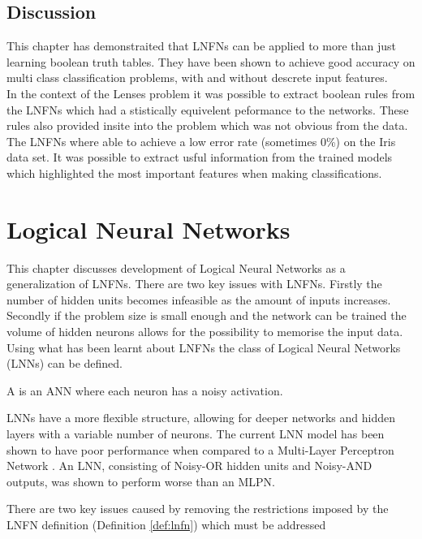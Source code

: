 \section{Discussion}
This chapter has demonstraited that LNFNs can be applied to more than just learning boolean truth tables. They have been shown to achieve good accuracy on multi class classification problems, with and without descrete input features.\\

In the context of the Lenses problem it was possible to extract boolean rules from the LNFNs which had a stistically equivelent peformance to the networks. These rules also provided insite into the problem which was not obvious from the data.\\

The LNFNs where able to achieve a low error rate (sometimes 0\%) on the Iris data set. It was possible to extract usful information from the trained models which highlighted the most important features when making classifications.

\chapter{Logical Neural Networks} \label{C:lnn}
This chapter discusses development of Logical Neural Networks as a generalization of LNFNs. There are two key issues with LNFNs. Firstly the number of hidden units becomes infeasible as the amount of inputs increases. Secondly if the problem size is small enough and the network can be trained the volume of hidden neurons allows for the possibility to memorise the input data.\\

Using what has been learnt about LNFNs the class of Logical Neural Networks (LNNs) can be defined.

\begin{definition}
	A  is an ANN where each neuron has a noisy activation.
\end{definition}

LNNs have a more flexible structure, allowing for deeper networks and hidden layers with a variable number of neurons. The current LNN model has been shown to have poor performance when compared to a Multi-Layer Perceptron Network \cite{LearningLogicalActivations}. An LNN, consisting of Noisy-OR hidden units and Noisy-AND outputs, was shown to perform worse than an MLPN. 

There are two key issues caused by removing the restrictions imposed by the LNFN definition (Definition \ref{def:lnfn}) which must be addressed 

